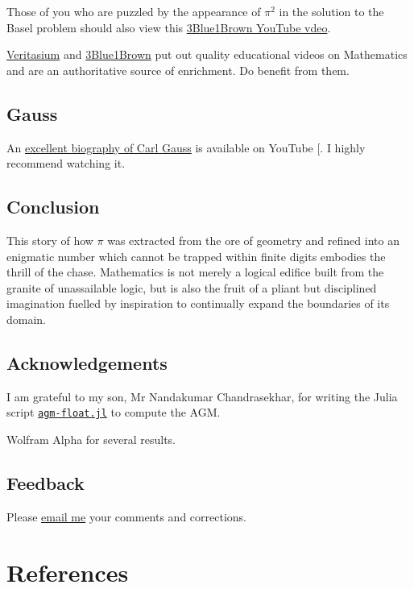 \documentclass[
  a4paper,
]{article}
\begin{document}
Those of you who are puzzled by the appearance of \(\pi^2\) in the
solution to the Basel problem should also view this
\href{https://www.youtube.com/watch?v=d-o3eB9sfls}{3Blue1Brown YouTube
vdeo}.

\href{https://www.youtube.com/@veritasium}{Veritasium} and
\href{https://www.youtube.com/c/3blue1brown}{3Blue1Brown} put out
quality educational videos on Mathematics and are an authoritative
source of enrichment. Do benefit from them.

\subsection{Gauss}\label{gauss}

An \href{https://www.youtube.com/watch?v=LmmyAOkajVM}{excellent
biography of Carl Gauss} is available on YouTube
{[}\citeproc{ref-gauss-bio}{29}{]}. I highly recommend watching it.

\subsection{Conclusion}\label{conclusion}

This story of how \(\pi\) was extracted from the ore of geometry and
refined into an enigmatic number which cannot be trapped within finite
digits embodies the thrill of the chase. Mathematics is not merely a
logical edifice built from the granite of unassailable logic, but is
also the fruit of a pliant but disciplined imagination fuelled by
inspiration to continually expand the boundaries of its domain.

\subsection{Acknowledgements}\label{acknowledgements}

I am grateful to my son, Mr Nandakumar Chandrasekhar, for writing the
Julia script \href{auxliary/agm-float.jl}{\texttt{agm-float.jl}} to
compute the AGM.

Wolfram Alpha for several results.

\subsection{Feedback}\label{feedback}

Please \href{mailto:feedback.swanlotus@gmail.com}{email me} your
comments and corrections.

\section*{References}\label{bibliography}
\end{document}
